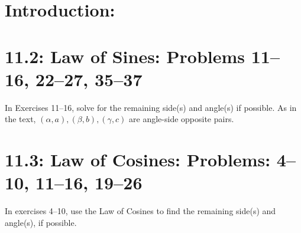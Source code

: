 \documentclass[10pt,letterpaper]{amspset}
\begin{document}

\section{Introduction:}


    
\pagebreak

\section{11.2: Law of Sines: Problems 11--16, 22--27, 35--37}

\begin{problem}
    In Exercises 11--16, solve for the remaining side(s) and angle(s) if possible. As in the text, $(\alpha, a), (\beta, b), (\gamma, c)$ are angle-side opposite pairs.
\end{problem}

















\section{11.3: Law of Cosines: Problems: 4--10, 11--16, 19--26}
\begin{problem}
    In exercises 4--10, use the Law of Cosines to find the remaining side(s) and angle(s), if possible.
\end{problem}














\end{document}
